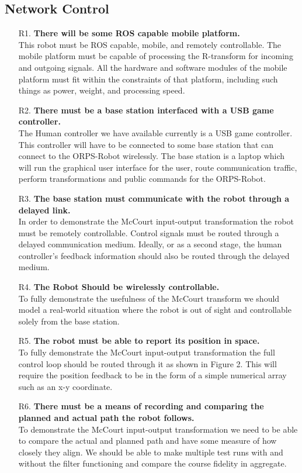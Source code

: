 \documentclass[english,12pt]{article}
\begin{document}
\subsection{Network Control}
\begin{itemize}
    \item[R1.] \textbf{There will be some ROS capable mobile platform.} \\
    This robot must be ROS capable, mobile, and remotely controllable. The mobile platform must be
    capable of processing the R-transform for incoming and outgoing signals. All the hardware and software
    modules of the mobile platform must fit within the constraints of that platform, including such things as
    power, weight, and processing speed.
    \item[R2.] \textbf{There must be a base station interfaced with a USB game controller.} \\
    The Human controller we have available currently is a USB game controller. This controller will have to
    be connected to some base station that can connect to the ORPS-Robot wirelessly. The base station is a
    laptop which will run the graphical user interface for the user, route communication traffic, perform
    transformations and public commands for the ORPS-Robot.
    \item[R3.] \textbf{The base station must communicate with the robot through a delayed link.} \\
    In order to demonstrate the McCourt input-output transformation the robot must be remotely
    controllable. Control signals must be routed through a delayed communication medium. Ideally, or as a
    second stage, the human controller’s feedback information should also be routed through the delayed
    medium.
    \item[R4.] \textbf{The Robot Should be wirelessly controllable.} \\
    To fully demonstrate the usefulness of the McCourt transform we should model a real-world situation
    where the robot is out of sight and controllable solely from the base station.
    \item[R5.] \textbf{The robot must be able to report its position in space.} \\
    To fully demonstrate the McCourt input-output transformation the full control loop should be routed
    through it as shown in Figure 2. This will require the position feedback to be in the form of a simple
    numerical array such as an x-y coordinate.
    \item[R6.] \textbf{There must be a means of recording and comparing the planned and actual path the robot follows.} \\
    To demonstrate the McCourt input-output transformation we need to be able to compare the actual
    and planned path and have some measure of how closely they align. We should be able to make
    multiple test runs with and without the filter functioning and compare the course fidelity in aggregate.
\end{itemize}
\end{document}
